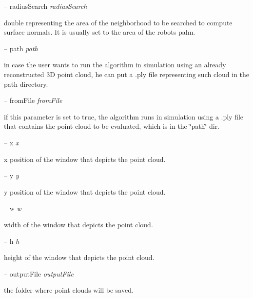 -- radius\+Search {\itshape radius\+Search} 
\begin{DoxyItemize}
\item double representing the area of the neighborhood to be searched to compute surface normals. It is usually set to the area of the robot\textquotesingle{}s palm.
\end{DoxyItemize}

-- path {\itshape path} 
\begin{DoxyItemize}
\item in case the user wants to run the algorithm in simulation using an already reconstructed 3D point cloud, he can put a .ply file representing such cloud in the path directory.
\end{DoxyItemize}

-- from\+File {\itshape from\+File} 
\begin{DoxyItemize}
\item if this parameter is set to true, the algorithm runs in simulation using a .ply file that contains the point cloud to be evaluated, which is in the \char`\"{}path\char`\"{} dir.
\end{DoxyItemize}

-- x {\itshape x} 
\begin{DoxyItemize}
\item x position of the window that depicts the point cloud.
\end{DoxyItemize}

-- y {\itshape y} 
\begin{DoxyItemize}
\item y position of the window that depicts the point cloud.
\end{DoxyItemize}

-- w {\itshape w} 
\begin{DoxyItemize}
\item width of the window that depicts the point cloud.
\end{DoxyItemize}

-- h {\itshape h} 
\begin{DoxyItemize}
\item height of the window that depicts the point cloud.
\end{DoxyItemize}

-- output\+File {\itshape output\+File} 
\begin{DoxyItemize}
\item the folder where point clouds will be saved.
\end{DoxyItemize}

